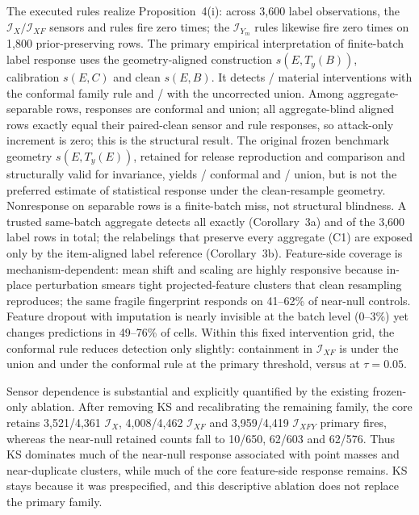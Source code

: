 \documentclass[10pt,journal,compsoc]{IEEEtran}
\newcommand{\IX}{\mathcal I_X}
\newcommand{\IXF}{\mathcal I_{XF}}
\newcommand{\IYm}{\mathcal I_{Y_m}}
\newcommand{\IXFY}{\mathcal I_{XFY}}
\begin{document}
The executed rules realize Proposition~4(i): across 3,600 label observations,
the $\IX/\IXF$ sensors and rules fire zero times; the $\IYm$ rules likewise fire
zero times on 1,800 prior-preserving rows. The primary empirical interpretation
of finite-batch label response uses the geometry-aligned construction
$s(E,T_y(B))$, calibration $s(E,C)$ and clean $s(E,B)$.
It detects
\AlignedLabelFamilyFires{}/\AlignedLabelMaterialDen{} material interventions
with the conformal family rule and
\AlignedLabelUnionFires{}/\AlignedLabelMaterialDen{} with the uncorrected union.
Among \AlignedLabelSeparableDen{} aggregate-separable rows, responses are
\AlignedLabelSeparableFamilyFires{} conformal and
\AlignedLabelSeparableUnionFires{} union; all \AlignedLabelBlindDen{}
aggregate-blind aligned rows exactly equal their paired-clean sensor and rule
responses, so attack-only increment is zero; this is the structural result.
The original frozen benchmark geometry $s(E,T_y(E))$, retained for release
reproduction and comparison and structurally valid for invariance, yields
\BatchFamilyLabelFires{}/\NMaterialLabel{} conformal and
\BatchUnionLabelFires{}/\NMaterialLabel{} union, but is not the preferred
estimate of statistical response under the clean-resample geometry. Nonresponse on
separable rows is a finite-batch miss, not structural blindness. A trusted same-batch aggregate
detects all \NMaterialLabel{} exactly (Corollary~3a) and \WitnessWNine{} of
the 3,600 label rows in total; the \WitnessWTen{} relabelings that preserve
every aggregate (C1) are exposed only by the item-aligned label reference
(Corollary~3b). Feature-side coverage is mechanism-dependent: mean shift and
scaling are highly responsive because in-place perturbation smears tight
projected-feature clusters that clean resampling reproduces; the same fragile
fingerprint responds on 41--62\% of near-null controls. Feature
dropout with imputation is nearly invisible at the batch level (0--3\%) yet
changes predictions in 49--76\% of cells. Within this fixed intervention grid,
the conformal rule reduces detection only slightly:
containment in $\IXF$ is \ContainUnionIXF{} under the union and
\ContainFamilyIXF{} under the conformal rule at the primary threshold,
\ContainFiveUnionIXF{} versus \ContainFiveFamilyIXF{} at $\tau=0.05$.

Sensor dependence is substantial and explicitly quantified by the existing
frozen-only ablation. After removing KS and recalibrating the remaining family,
the core retains 3,521/4,361 $\IX$, 4,008/4,462 $\IXF$ and 3,959/4,419
$\IXFY$ primary fires, whereas the near-null retained counts fall to 10/650,
62/603 and 62/576. Thus KS dominates much of the near-null response associated
with point masses and near-duplicate clusters, while much of the core
feature-side response remains. KS stays because it was prespecified, and this
descriptive ablation does not replace the primary family.
\end{document}
